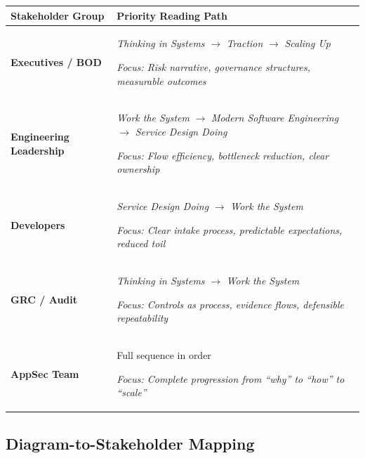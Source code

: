 \documentclass[11pt,letterpaper]{article}
\newcommand{\booktitle}[1]{\textit{#1}}
\begin{document}
\begin{center}
\renewcommand{\arraystretch}{1.5}
\begin{tabular}{p{3.5cm}p{9cm}}
\toprule
\textbf{Stakeholder Group} & \textbf{Priority Reading Path} \\
\midrule
\textbf{Executives / BOD} &
\booktitle{Thinking in Systems} $\rightarrow$ \booktitle{Traction} $\rightarrow$ \booktitle{Scaling Up}

\textit{Focus: Risk narrative, governance structures, measurable outcomes} \\
\midrule
\textbf{Engineering Leadership} &
\booktitle{Work the System} $\rightarrow$ \booktitle{Modern Software Engineering} $\rightarrow$ \booktitle{Service Design Doing}

\textit{Focus: Flow efficiency, bottleneck reduction, clear ownership} \\
\midrule
\textbf{Developers} &
\booktitle{Service Design Doing} $\rightarrow$ \booktitle{Work the System}

\textit{Focus: Clear intake process, predictable expectations, reduced toil} \\
\midrule
\textbf{GRC / Audit} &
\booktitle{Thinking in Systems} $\rightarrow$ \booktitle{Work the System}

\textit{Focus: Controls as process, evidence flows, defensible repeatability} \\
\midrule
\textbf{AppSec Team} &
Full sequence in order

\textit{Focus: Complete progression from ``why'' to ``how'' to ``scale''} \\
\bottomrule
\end{tabular}
\end{center}

\subsection{Diagram-to-Stakeholder Mapping}
\end{document}
